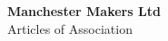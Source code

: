 

\begin{titlepage}
\begin{center}
{\bf \LARGE Manchester Makers Ltd}\\[36pt]
{\Large Articles of Association}

\vfill

\end{center}
\end{titlepage}



